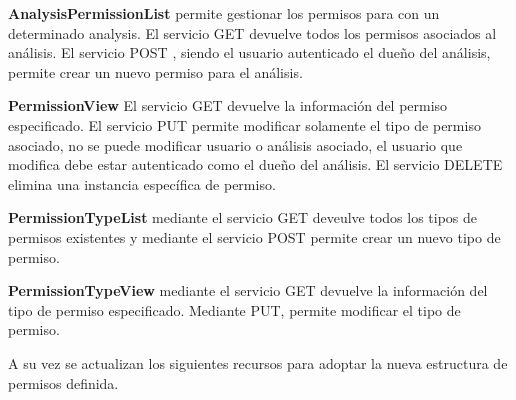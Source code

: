 \textbf{AnalysisPermissionList} permite gestionar los permisos para con un determinado analysis. El servicio GET devuelve todos los permisos asociados al análisis. El servicio POST , siendo el usuario autenticado el dueño del análisis, permite crear un nuevo permiso para el análisis.

\textbf{PermissionView} El servicio GET devuelve la información del permiso especificado. El servicio PUT permite modificar solamente el tipo de permiso asociado, no se puede modificar usuario o análisis asociado, el usuario que modifica debe estar autenticado como el dueño del análisis. El servicio DELETE elimina una instancia específica de permiso.

\textbf{PermissionTypeList} mediante el servicio GET deveulve todos los tipos de permisos existentes y mediante el servicio POST permite crear un nuevo tipo de permiso.

\textbf{PermissionTypeView} mediante el servicio GET devuelve la información del tipo de permiso especificado. Mediante PUT, permite modificar el tipo de permiso.

A su vez se actualizan los siguientes recursos para adoptar la nueva estructura de permisos definida.

